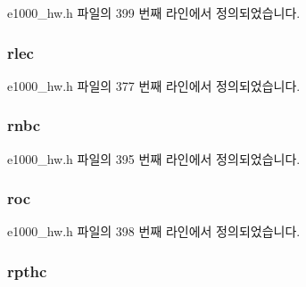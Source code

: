 e1000\+\_\+hw.\+h 파일의 399 번째 라인에서 정의되었습니다.

\subsubsection[{\texorpdfstring{rlec}{rlec}}]{ rlec}\hypertarget{structe1000__hw__stats_a219a2a1fc5534de9eed8e85764c09a7a}{}\label{structe1000__hw__stats_a219a2a1fc5534de9eed8e85764c09a7a}


e1000\+\_\+hw.\+h 파일의 377 번째 라인에서 정의되었습니다.

\subsubsection[{\texorpdfstring{rnbc}{rnbc}}]{ rnbc}\hypertarget{structe1000__hw__stats_a5cffa728a815753228e8089de68e002c}{}\label{structe1000__hw__stats_a5cffa728a815753228e8089de68e002c}


e1000\+\_\+hw.\+h 파일의 395 번째 라인에서 정의되었습니다.

\subsubsection[{\texorpdfstring{roc}{roc}}]{ roc}\hypertarget{structe1000__hw__stats_aa2c345ea755e5e3c4e08f8276de64da3}{}\label{structe1000__hw__stats_aa2c345ea755e5e3c4e08f8276de64da3}


e1000\+\_\+hw.\+h 파일의 398 번째 라인에서 정의되었습니다.

\subsubsection[{\texorpdfstring{rpthc}{rpthc}}]{ rpthc}\hypertarget{structe1000__hw__stats_a7f62cff4887a01fd5fb437476139e8ed}{}\label{structe1000__hw__stats_a7f62cff4887a01fd5fb437476139e8ed}


